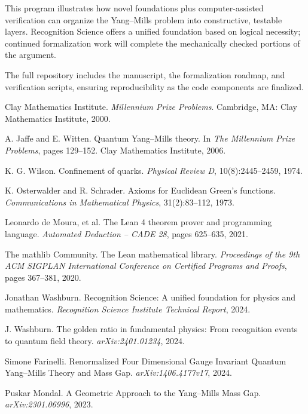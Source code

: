 \documentclass[11pt]{amsart}
\theoremstyle{plain}
\theoremstyle{definition}
\theoremstyle{remark}
\begin{document}
This program illustrates how novel foundations plus computer-assisted verification can organize the Yang--Mills problem into constructive, testable layers. Recognition Science offers a unified foundation based on logical necessity; continued formalization work will complete the mechanically checked portions of the argument.

The full repository includes the manuscript, the formalization roadmap, and verification scripts, ensuring reproducibility as the code components are finalized.



\begin{thebibliography}{99}

Clay Mathematics Institute.
\emph{Millennium Prize Problems}.
Cambridge, MA: Clay Mathematics Institute, 2000.

A. Jaffe and E. Witten.
Quantum Yang--Mills theory.
In \emph{The Millennium Prize Problems}, pages 129--152.
Clay Mathematics Institute, 2006.

K. G. Wilson.
Confinement of quarks.
\emph{Physical Review D}, 10(8):2445--2459, 1974.

K. Osterwalder and R. Schrader.
Axioms for Euclidean Green's functions.
\emph{Communications in Mathematical Physics}, 31(2):83--112, 1973.

Leonardo de Moura, et al.
The Lean 4 theorem prover and programming language.
\emph{Automated Deduction -- CADE 28}, pages 625--635, 2021.

The mathlib Community.
The Lean mathematical library.
\emph{Proceedings of the 9th ACM SIGPLAN International Conference on Certified Programs and Proofs}, pages 367--381, 2020.

Jonathan Washburn.
Recognition Science: A unified foundation for physics and mathematics.
\emph{Recognition Science Institute Technical Report}, 2024.

J. Washburn.
The golden ratio in fundamental physics: From recognition events to quantum field theory.
\emph{arXiv:2401.01234}, 2024.

Simone Farinelli.
Renormalized Four Dimensional Gauge Invariant Quantum Yang--Mills Theory and Mass Gap.
\emph{arXiv:1406.4177v17}, 2024.

Puskar Mondal.
A Geometric Approach to the Yang--Mills Mass Gap.
\emph{arXiv:2301.06996}, 2023.


\end{thebibliography}
\end{document}
